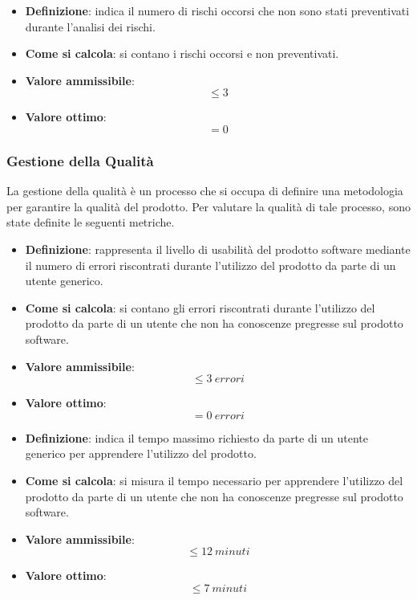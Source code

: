 \begin{itemize}
	\item \textbf{Definizione}: indica il numero di rischi occorsi che non sono stati preventivati durante l'analisi dei rischi.
	\item \textbf{Come si calcola}: si contano i rischi occorsi e non preventivati.
	\item \textbf{Valore ammissibile}: \begin{equation*}\leq 3\end{equation*}
	\item \textbf{Valore ottimo}: \begin{equation*}= 0\end{equation*}
\end{itemize}



\subsubsection{Gestione della Qualità}
La gestione della qualità è un processo che si occupa di definire una metodologia per garantire la qualità del prodotto. Per valutare la qualità di tale processo, sono state definite le seguenti metriche.

\begin{itemize}
	\item \textbf{Definizione}: rappresenta il livello di usabilità del prodotto software mediante il numero di errori riscontrati durante l'utilizzo del prodotto da parte di un utente generico.
	\item \textbf{Come si calcola}: si contano gli errori riscontrati durante l'utilizzo del prodotto da parte di un utente che non ha conoscenze pregresse sul prodotto software.
	\item \textbf{Valore ammissibile}: \begin{equation*}\leq 3\ errori\end{equation*}
	\item \textbf{Valore ottimo}: \begin{equation*}= 0\ errori\end{equation*}
\end{itemize}

\begin{itemize}
	\item \textbf{Definizione}: indica il tempo massimo richiesto da parte di un utente generico per apprendere l'utilizzo del prodotto.
	\item \textbf{Come si calcola}: si misura il tempo necessario per apprendere l'utilizzo del prodotto da parte di un utente che non ha conoscenze pregresse sul prodotto software.
	\item \textbf{Valore ammissibile}: \begin{equation*}\leq 12\ minuti\end{equation*}
	\item \textbf{Valore ottimo}: \begin{equation*}\leq 7\ minuti\end{equation*}
\end{itemize}

